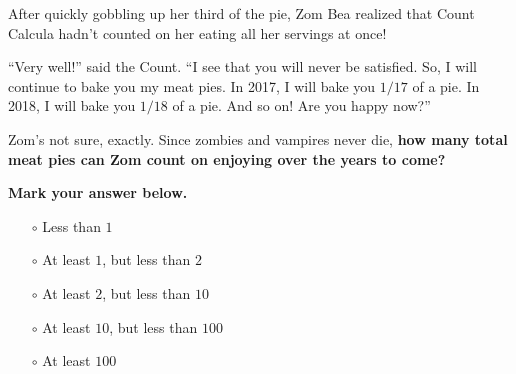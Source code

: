 


After quickly gobbling up her third of the pie, Zom Bea realized that Count
Calcula hadn't counted on her eating all her servings at once!

``Very well!'' said the Count. ``I see that you will never be satisfied.
So, I will continue to bake you my meat pies. In 2017, I will bake you
\(1/17\) of a pie. In 2018, I will bake you \(1/18\) of a pie. And so on!
Are you happy now?''

Zom's not sure, exactly. Since zombies and vampires never die, \textbf{how many
total meat pies can Zom count on enjoying over the years to come?}

\vspace{2em}

\textbf{Mark your answer below.}

\begin{itemize}
  \item[\Huge\(\circ\)] Less than \(1\)
  \item[\Huge\(\circ\)] At least \(1\), but less than \(2\)
  \item[\Huge\(\circ\)] At least \(2\), but less than \(10\)
  \item[\Huge\(\circ\)] At least \(10\), but less than \(100\)
  \item[\Huge\(\circ\)] At least \(100\)
\end{itemize}
